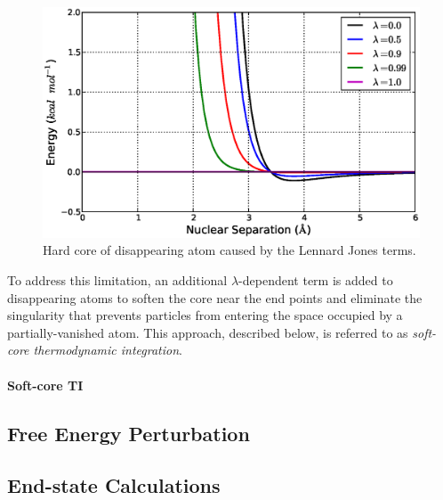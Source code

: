 \begin{figure}
   \includegraphics[width=6.5in]{HardCore.ps}
   \caption{Hard core of disappearing atom caused by the Lennard Jones terms.}
   \label{fig2:HardCore}
\end{figure}

To address this limitation, an additional $\lambda$-dependent term is added to
disappearing atoms to soften the core near the end points and eliminate the
singularity that prevents particles from entering the space occupied by a
partially-vanished atom. This approach, described below, is referred to as
\emph{soft-core thermodynamic integration}.

\paragraph{Soft-core TI}

\subsection{Free Energy Perturbation}

\subsection{End-state Calculations}
